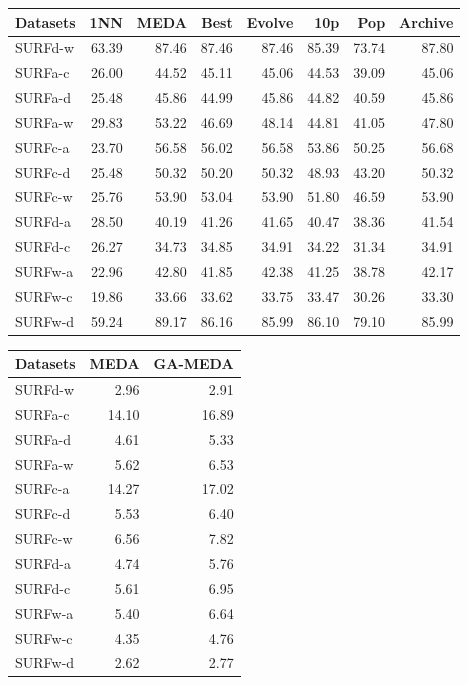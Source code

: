 \documentclass[a4paper]{article}
\begin{document}
	\begin{tabular}{lrrrrrrr}
		\toprule
		Datasets &    1NN &   MEDA &   Best &  Evolve &    10p &    Pop &  Archive \\
		\midrule
		SURFd-w &  63.39 &  87.46 &  87.46 &   87.46 &  85.39 &  73.74 &    87.80 \\
		SURFa-c &  26.00 &  44.52 &  45.11 &   45.06 &  44.53 &  39.09 &    45.06 \\
		SURFa-d &  25.48 &  45.86 &  44.99 &   45.86 &  44.82 &  40.59 &    45.86 \\
		SURFa-w &  29.83 &  53.22 &  46.69 &   48.14 &  44.81 &  41.05 &    47.80 \\
		SURFc-a &  23.70 &  56.58 &  56.02 &   56.58 &  53.86 &  50.25 &    56.68 \\
		SURFc-d &  25.48 &  50.32 &  50.20 &   50.32 &  48.93 &  43.20 &    50.32 \\
		SURFc-w &  25.76 &  53.90 &  53.04 &   53.90 &  51.80 &  46.59 &    53.90 \\
		SURFd-a &  28.50 &  40.19 &  41.26 &   41.65 &  40.47 &  38.36 &    41.54 \\
		SURFd-c &  26.27 &  34.73 &  34.85 &   34.91 &  34.22 &  31.34 &    34.91 \\
		SURFw-a &  22.96 &  42.80 &  41.85 &   42.38 &  41.25 &  38.78 &    42.17 \\
		SURFw-c &  19.86 &  33.66 &  33.62 &   33.75 &  33.47 &  30.26 &    33.30 \\
		SURFw-d &  59.24 &  89.17 &  86.16 &   85.99 &  86.10 &  79.10 &    85.99 \\
		\bottomrule
	\end{tabular}
	
	\begin{tabular}{lrr}
		\toprule
		Datasets &   MEDA &  GA-MEDA \\
		\midrule
		SURFd-w &   2.96 &     2.91 \\
		SURFa-c &  14.10 &    16.89 \\
		SURFa-d &   4.61 &     5.33 \\
		SURFa-w &   5.62 &     6.53 \\
		SURFc-a &  14.27 &    17.02 \\
		SURFc-d &   5.53 &     6.40 \\
		SURFc-w &   6.56 &     7.82 \\
		SURFd-a &   4.74 &     5.76 \\
		SURFd-c &   5.61 &     6.95 \\
		SURFw-a &   5.40 &     6.64 \\
		SURFw-c &   4.35 &     4.76 \\
		SURFw-d &   2.62 &     2.77 \\
		\bottomrule
	\end{tabular}
	
\end{document}
